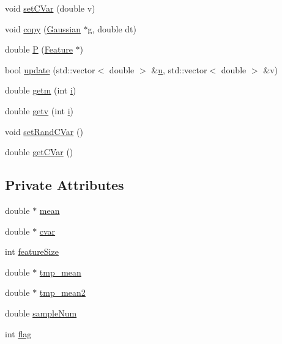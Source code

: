 \begin{DoxyCompactItemize}
void \hyperlink{class_gaussian_a378da84bf9ca0bf56a0c6626515c7545}{set\+C\+Var} (double v)
\item 
void \hyperlink{class_gaussian_a64b4da3d5cc6a6c2db64dba6f8909f70}{copy} (\hyperlink{class_gaussian}{Gaussian} $\ast$g, double dt)
\item 
double \hyperlink{class_gaussian_a0d60409e0133613b53d290e51bf8a425}{P} (\hyperlink{class_feature}{Feature} $\ast$)
\item 
bool \hyperlink{class_gaussian_ae6eaa5005d9e5c0661c7a7fbc1eaecdc}{update} (std\+::vector$<$ double $>$ \&\hyperlink{process__options_8m_a4c78390f8387d6324b7af70192ee2db2}{u}, std\+::vector$<$ double $>$ \&v)
\item 
double \hyperlink{class_gaussian_abf9704705d1986fe933c6107a1eb9a1f}{getm} (int \hyperlink{process__options_8m_a6f6ccfcf58b31cb6412107d9d5281426}{i})
\item 
double \hyperlink{class_gaussian_aa6de1a1434cec2f93e065b33a2d9611f}{getv} (int \hyperlink{process__options_8m_a6f6ccfcf58b31cb6412107d9d5281426}{i})
\item 
void \hyperlink{class_gaussian_a5ff346209d1dbfdb8135e969b0d54cee}{set\+Rand\+C\+Var} ()
\item 
double \hyperlink{class_gaussian_acca19cc0e5601bbd767a0c86d9ff9d13}{get\+C\+Var} ()
\end{DoxyCompactItemize}
\subsection*{Private Attributes}
\begin{DoxyCompactItemize}
\item 
double $\ast$ \hyperlink{class_gaussian_a600a38f80fb60dc09f19cfabbf8af5f8}{mean}
\item 
double $\ast$ \hyperlink{class_gaussian_a2a66072c73e3705d524ff5a8380b1695}{cvar}
\item 
int \hyperlink{class_gaussian_a63ce4e0586107dc417039d7c27233e51}{feature\+Size}
\item 
double $\ast$ \hyperlink{class_gaussian_a2cb98c41e2ef235cc797dde7eaf82ff0}{tmp\+\_\+mean}
\item 
double $\ast$ \hyperlink{class_gaussian_a116f6507f12be2f0d560016740e005f0}{tmp\+\_\+mean2}
\item 
double \hyperlink{class_gaussian_a61a7510b273ac1cb30229b874304d4db}{sample\+Num}
\item 
int \hyperlink{class_gaussian_a8a05e3e9decc65bc9e5213a87768c941}{flag}
\end{DoxyCompactItemize}


